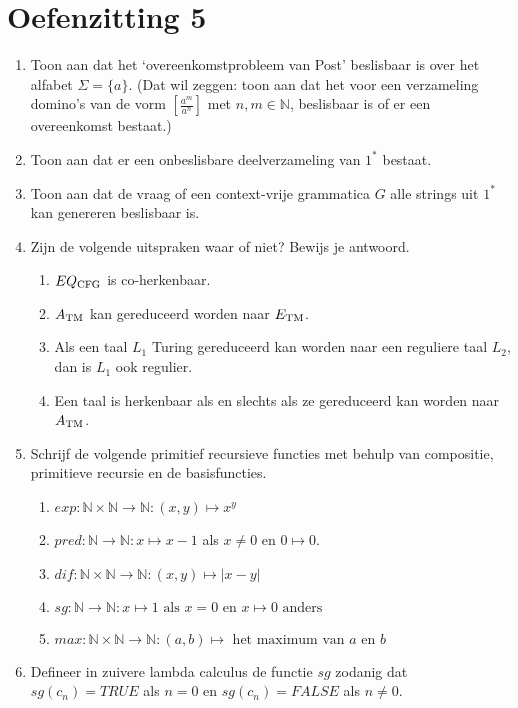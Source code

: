 \documentclass[a4paper]{article}
\newcommand{\N}{\mathbb{N}}
\begin{document}
\pagestyle{empty}

\section*{Oefenzitting 5}


\begin{enumerate}
   \item Toon aan dat het `overeenkomstprobleem van Post' beslisbaar is over het alfabet $\Sigma = \{ a \}$. (Dat wil zeggen: toon aan dat het voor een verzameling domino's van de vorm $\left[ \frac{a^m}{a^n} \right]$ met $n,m \in \mathbb{N}$, beslisbaar is of er een overeenkomst bestaat.) 
\item Toon aan dat er een onbeslisbare deelverzameling van $1^*$ bestaat.
 \item Toon aan dat de vraag of een context-vrije grammatica $G$ alle strings uit $1^*$ kan genereren beslisbaar is.
 \item Zijn de volgende uitspraken waar of niet? Bewijs je antwoord.
		   \begin{enumerate}
			   \item $EQ_{\rm CFG}$ is co-herkenbaar.
				\item $A_{\rm TM}$ kan gereduceerd worden naar $E_{\rm TM}$.
				\item Als een taal $L_1$ Turing gereduceerd kan worden naar een reguliere taal $L_2$, dan is $L_1$ ook regulier.
				\item Een taal is herkenbaar als en slechts als ze gereduceerd kan worden naar $A_{\rm TM}$.
			\end{enumerate}
	\item Schrijf de volgende primitief recursieve functies met behulp van compositie, primitieve recursie en de basisfuncties.
			\begin{enumerate}
				\item $exp : \N \times \N \to \N : (x,y) \mapsto x^y$
				\item $pred : \N \to \N : x \mapsto x - 1$ als $x \neq 0$ en $0 \mapsto 0$.
				\item $dif : \N \times \N \to \N : (x,y) \mapsto | x - y |$
				\item $sg : \mathbb{N} \to \mathbb{N} : x \mapsto 1 \text{ als $x = 0$ en $x \mapsto 0$ anders}$
				\item $max : \mathbb{N} \times \mathbb{N} \to \mathbb{N} : (a,b) \mapsto \text{ het maximum van $a$ en $b$}$
			\end{enumerate}
   \item Defineer in zuivere lambda calculus de functie $sg$ zodanig dat $sg(c_n) = TRUE$ als $n = 0$ en $sg(c_n) = FALSE$ als $n \neq 0$.
\end{enumerate}
\end{document}

